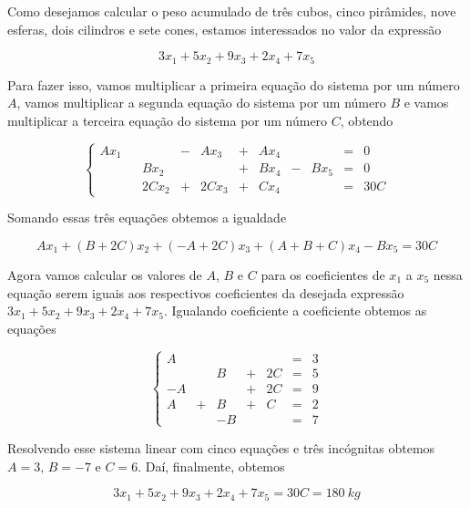 \begin{solution}
\begin{enumerate}
Como desejamos calcular o peso acumulado de três cubos, cinco pirâmides, nove esferas, dois cilindros e sete cones, estamos interessados no valor da expressão

$$3x_1 + 5x_2 + 9x_3 + 2x_4 + 7x_5$$

Para fazer isso, vamos multiplicar a primeira equação do sistema por um número $A$, vamos multiplicar a segunda equação do sistema por um número $B$ e vamos multiplicar a terceira equação do sistema por um número $C$, obtendo

$$\left\{\begin{array}{rrrrrrrrrrr}
  Ax_1   &   &            & - &   Ax_3   & + &    Ax_4    &   &         & = &    0 \\
         &   &    Bx_2    &   &          & + &    Bx_4    & - &   Bx_5  & = &    0 \\
         &   &   2Cx_2    & + &  2Cx_3   & + &    Cx_4    &   &         & = &    30C \end{array}\right.$$ 

Somando essas três equações obtemos a igualdade

$$Ax_1 + (B+2C)x_2 + (-A+2C)x_3 + (A+B+C)x_4 - Bx_5 = 30C$$

Agora vamos calcular os valores de $A$, $B$ e $C$ para os coeficientes de $x_1$ a $x_5$ nessa equação serem iguais aos respectivos coeficientes da desejada expressão $3x_1 + 5x_2 + 9x_3 + 2x_4 + 7x_5$. Igualando coeficiente a coeficiente obtemos as equações

$$\left\{\begin{array}{rrrrrrr}
 A  &   &      &   &           & = &   3 \\
    &   &   B  & + &     2C    & = &   5 \\
-A  &   &      & + &     2C    & = &   9 \\
 A  & + &   B  & + &      C    & = &   2 \\
    &   &  -B  &   &           & = &   7  \end{array}\right.$$

Resolvendo esse sistema linear com cinco equações e três incógnitas obtemos $A=3$, $B=-7$ e $C=6$.
Daí, finalmente, obtemos 

$$3x_1 + 5x_2 + 9x_3 + 2x_4 + 7x_5 = 30C = 180\ kg$$
\end{enumerate}
\end{solution}

